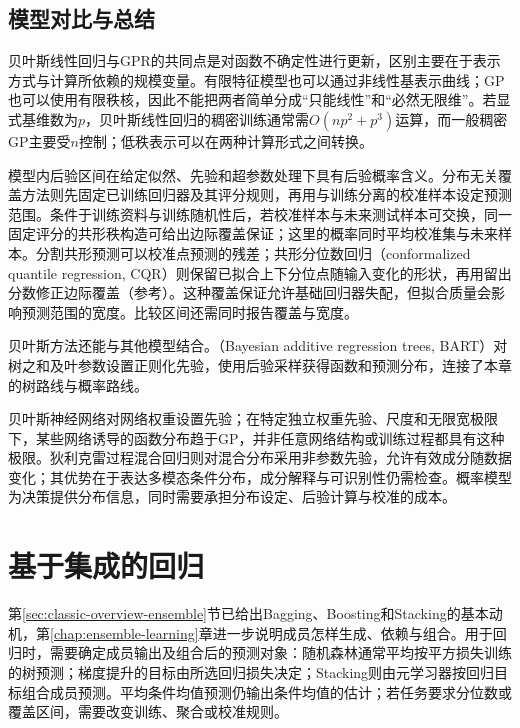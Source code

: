 \subsection{模型对比与总结}

贝叶斯线性回归与GPR的共同点是对函数不确定性进行更新，区别主要在于表示方式与计算所依赖的规模变量。有限特征模型也可以通过非线性基表示曲线；GP也可以使用有限秩核，因此不能把两者简单分成“只能线性”和“必然无限维”。若显式基维数为$p$，贝叶斯线性回归的稠密训练通常需$O(np^2+p^3)$运算，而一般稠密GP主要受$n$控制；低秩表示可以在两种计算形式之间转换。

模型内后验区间在给定似然、先验和超参数处理下具有后验概率含义。分布无关覆盖方法则先固定已训练回归器及其评分规则，再用与训练分离的校准样本设定预测范围。条件于训练资料与训练随机性后，若校准样本与未来测试样本可交换，同一固定评分的共形秩构造可给出边际覆盖保证；这里的概率同时平均校准集与未来样本。分割共形预测可以校准点预测的残差；共形分位数回归（conformalized quantile regression, CQR）则保留已拟合上下分位点随输入变化的形状，再用留出分数修正边际覆盖（参考）。这种覆盖保证允许基础回归器失配，但拟合质量会影响预测范围的宽度。比较区间还需同时报告覆盖与宽度。

贝叶斯方法还能与其他模型结合。（Bayesian additive regression trees, BART）对树之和及叶参数设置正则化先验，使用后验采样获得函数和预测分布，连接了本章的树路线与概率路线。

贝叶斯神经网络对网络权重设置先验；在特定独立权重先验、尺度和无限宽极限下，某些网络诱导的函数分布趋于GP，并非任意网络结构或训练过程都具有这种极限。狄利克雷过程混合回归则对混合分布采用非参数先验，允许有效成分随数据变化；其优势在于表达多模态条件分布，成分解释与可识别性仍需检查。概率模型为决策提供分布信息，同时需要承担分布设定、后验计算与校准的成本。

\section{基于集成的回归}
\label{sec:regression-ensemble}

第\ref{sec:classic-overview-ensemble}节已给出Bagging、Boosting和Stacking的基本动机，第\ref{chap:ensemble-learning}章进一步说明成员怎样生成、依赖与组合。用于回归时，需要确定成员输出及组合后的预测对象：随机森林通常平均按平方损失训练的树预测；梯度提升的目标由所选回归损失决定；Stacking则由元学习器按回归目标组合成员预测。平均条件均值预测仍输出条件均值的估计；若任务要求分位数或覆盖区间，需要改变训练、聚合或校准规则。

